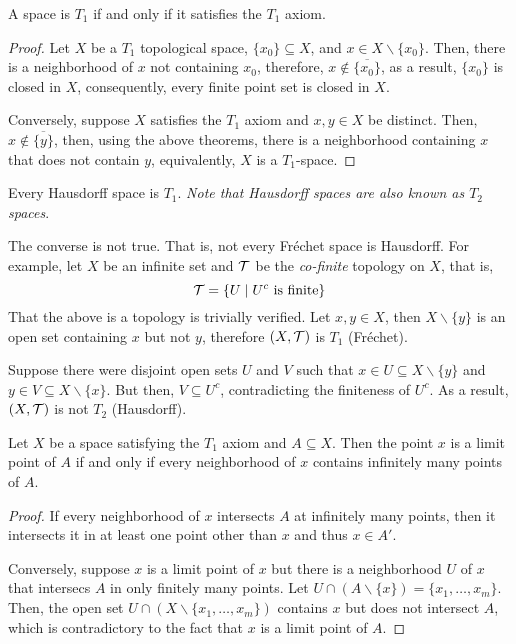 \begin{theorem}
    A space is $T_1$ if and only if it satisfies the $T_1$ axiom.
\end{theorem}
\begin{proof}
    Let $X$ be a $T_1$ topological space, $\{x_0\}\subseteq X$, and $x\in X\backslash\{x_0\}$. Then, there is a neighborhood of $x$ not containing $x_0$, therefore, $x\notin\overline{\{x_0\}}$, as a result, $\{x_0\}$ is closed in $X$, consequently, every finite point set is closed in $X$.

    Conversely, suppose $X$ satisfies the $T_1$ axiom and $x,y\in X$ be distinct. Then, $x\notin\overline{\{y\}}$, then, using the above theorems, there is a neighborhood containing $x$ that does not contain $y$, equivalently, $X$ is a $T_1$-space.
\end{proof}

\begin{corollary}
    Every Hausdorff space is $T_1$. \textit{Note that Hausdorff spaces are also known as $T_2$ spaces}.
\end{corollary}

\begin{mdframed}
    The converse is not true. That is, not every Fr\'echet space is Hausdorff. For example, let $X$ be an infinite set and $\mathcal{T}$ be the \textit{co-finite} topology on $X$, that is, 
    \begin{equation*}
        \mathcal{T} = \{U\mid \text{$U^c$ is finite}\}
    \end{equation*}
    That the above is a topology is trivially verified. Let $x,y\in X$, then $X\backslash\{y\}$ is an open set containing $x$ but not $y$, therefore $(X,\mathcal{T})$ is $T_1$ (Fr\'echet).

    Suppose there were disjoint open sets $U$ and $V$ such that $x\in U\subseteq X\backslash\{y\}$ and $y\in V\subseteq X\backslash\{x\}$. But then, $V\subseteq U^c$, contradicting the finiteness of $U^c$. As a result, $(X,\mathcal{T})$ is not $T_2$ (Hausdorff).
\end{mdframed}

\begin{theorem}
    Let $X$ be a space satisfying the $T_1$ axiom and $A\subseteq X$. Then the point $x$ is a limit point of $A$ if and only if every neighborhood of $x$ contains infinitely many points of $A$.
\end{theorem}
\begin{proof}
    If every neighborhood of $x$ intersects $A$ at infinitely many points, then it intersects it in at least one point other than $x$ and thus $x\in A'$.
    
    Conversely, suppose $x$ is a limit point of $x$ but there is a neighborhood $U$ of $x$ that intersecs $A$ in only finitely many points. Let $U\cap(A\backslash\{x\}) = \{x_1,\ldots,x_m\}$. Then, the open set $U\cap(X\backslash\{x_1,\ldots,x_m\})$ contains $x$ but does not intersect $A$, which is contradictory to the fact that $x$ is a limit point of $A$.
\end{proof}

